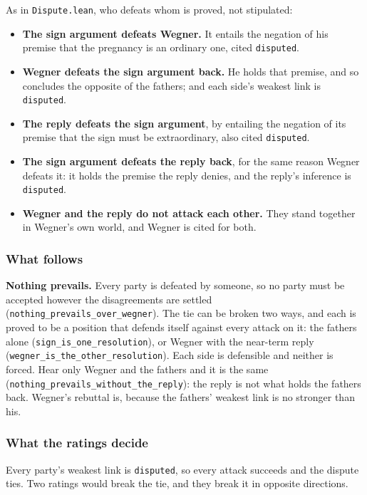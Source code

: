\documentclass[11pt]{article}
\begin{document}
As in \texttt{Dispute.lean}, who defeats whom is proved, not stipulated:

\begin{itemize}
  \item \textbf{The sign argument defeats Wegner.} It entails the negation of his premise that the pregnancy is an ordinary one, cited \texttt{disputed}.
  \item \textbf{Wegner defeats the sign argument back.} He holds that premise, and so concludes the opposite of the fathers; and each side’s weakest link is \texttt{disputed}.
  \item \textbf{The reply defeats the sign argument}, by entailing the negation of its premise that the sign must be extraordinary, also cited \texttt{disputed}.
  \item \textbf{The sign argument defeats the reply back}, for the same reason Wegner defeats it: it holds the premise the reply denies, and the reply’s inference is \texttt{disputed}.
  \item \textbf{Wegner and the reply do not attack each other.} They stand together in Wegner’s own world, and Wegner is cited for both.
\end{itemize}
\subsubsection*{What follows}
\textbf{Nothing prevails.} Every party is defeated by someone, so no party must be accepted however the disagreements are settled (\texttt{nothing\_\allowbreak{}prevails\_\allowbreak{}over\_\allowbreak{}wegner}). The tie can be broken two ways, and each is proved to be a position that defends itself against every attack on it: the fathers alone (\texttt{sign\_\allowbreak{}is\_\allowbreak{}one\_\allowbreak{}resolution}), or Wegner with the near-term reply (\texttt{wegner\_\allowbreak{}is\_\allowbreak{}the\_\allowbreak{}other\_\allowbreak{}resolution}). Each side is defensible and neither is forced. Hear only Wegner and the fathers and it is the same (\texttt{nothing\_\allowbreak{}prevails\_\allowbreak{}without\_\allowbreak{}the\_\allowbreak{}reply}): the reply is not what holds the fathers back. Wegner’s rebuttal is, because the fathers’ weakest link is no stronger than his.

\subsubsection*{What the ratings decide}
Every party’s weakest link is \texttt{disputed}, so every attack succeeds and the dispute ties. Two ratings would break the tie, and they break it in opposite directions.
\end{document}
